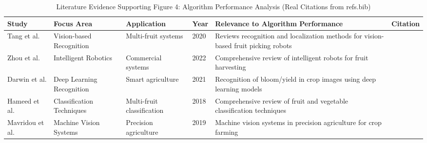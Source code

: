 \begin{table*}[htbp]
\centering
\small
\caption{Literature Evidence Supporting Figure 4: Algorithm Performance Analysis (Real Citations from refs.bib)}
\label{tab:figure4_real_support}
\begin{tabular}{p{}p{}p{}p{}p{}p{}}
\toprule
\textbf{Study} & \textbf{Focus Area} & \textbf{Application} & \textbf{Year} & \textbf{Relevance to Algorithm Performance} & \textbf{Citation} \\ \midrule

Tang et al. & Vision-based Recognition & Multi-fruit systems & 2020 & Reviews recognition and localization methods for vision-based fruit picking robots & \cite{tang2020recognition} \\

Zhou et al. & Intelligent Robotics & Commercial systems & 2022 & Comprehensive review of intelligent robots for fruit harvesting & \cite{zhou2022intelligent} \\

Darwin et al. & Deep Learning Recognition & Smart agriculture & 2021 & Recognition of bloom/yield in crop images using deep learning models & \cite{darwin2021recognition} \\

Hameed et al. & Classification Techniques & Multi-fruit classification & 2018 & Comprehensive review of fruit and vegetable classification techniques & \cite{hameed2018comprehensive} \\

Mavridou et al. & Machine Vision Systems & Precision agriculture & 2019 & Machine vision systems in precision agriculture for crop farming & \cite{mavridou2019machine} \\

\bottomrule
\end{tabular}
\end{table*}

